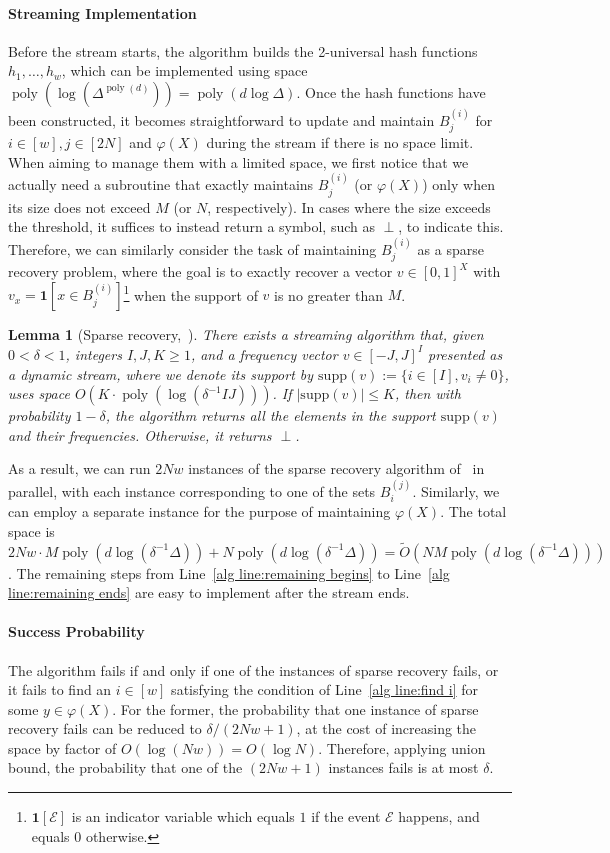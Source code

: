 \documentclass[letterpaper,11pt]{article}
\theoremstyle{plain}
\newtheorem{lemma}[theorem]{Lemma}
\theoremstyle{definition}
\theoremstyle{remark}
\DeclareMathOperator{\poly}{poly}
\renewcommand{\phi}{\varphi}
\newcommand{\calE}{\mathcal{E}}
\newcommand{\supp}{\mathrm{supp}}
\begin{document}
\begin{appendices}
\paragraph{Streaming Implementation}
Before the stream starts, the algorithm builds the 2-universal hash functions $h_1,\dots, h_w$, which can be implemented using space $\poly(\log (\Delta^{\poly(d)})) = \poly(d\log\Delta)$. 
Once the hash functions  have been constructed, it becomes straightforward to update and maintain $B^{(i)}_j$ for $i\in[w],j\in[2 N]$ and $\phi(X)$ during the stream if there is no space limit. 
When aiming to manage them with a limited space, we first notice that we actually need a subroutine that exactly maintains $B^{(i)}_j$ (or $\phi(X)$) only when its size does not exceed $ M$ (or $ N$, respectively).
In cases where the size exceeds the threshold, it suffices to instead return a symbol, such as $\perp$, to indicate this.
Therefore, we can similarly consider the task of maintaining $B_j^{(i)}$ as a sparse recovery problem, where the goal is to exactly recover a vector $v\in [0,1]^X$ with $v_x=\mathbf{1}[x\in B_j^{(i)}]$\footnote{$\mathbf{1}[\calE]$ is an indicator variable which equals $1$ if the event $\calE$ happens, and equals $0$ otherwise.} when the support of $v$ is no greater than $ M$.
\begin{lemma}[Sparse recovery,~\cite{Cormode06Combinatorial}]
    \label{lem:sparse recovery}
    There exists a streaming algorithm that, given $0<\delta<1$, integers $I,J,K\ge 1$, and a frequency vector $v\in [-J,J]^I$ presented as a dynamic stream, where we denote its support by $\supp(v):=\{i\in[I], v_i\neq 0\}$, uses space $O(K\cdot \poly(\log(\delta^{-1}IJ)))$. If $|\supp(v)|\le K$, then with probability $1-\delta$, the algorithm returns all the elements in the support $\supp(v)$ and their frequencies. Otherwise, it returns $\perp$.
\end{lemma}
As a result, we can run $2 N w$ instances of the sparse recovery algorithm of~ in parallel, with each instance corresponding to one of the sets $B_i^{(j)}$.
Similarly, we can employ a separate instance for the purpose of maintaining $\phi(X)$. The total space is $2 N w\cdot  M\poly(d\log(\delta^{-1}\Delta)) +  N\poly(d\log(\delta^{-1}\Delta)) = \tilde O( N M \poly(d\log(\delta^{-1}\Delta)))$. The remaining steps from Line~\ref{alg line:remaining begins} to Line~\ref{alg line:remaining ends} are easy to implement after the stream ends.
\paragraph{Success Probability} The algorithm fails if and only if one of the instances of sparse recovery fails, or it fails to find an $i\in [w]$ satisfying the condition of Line~\ref{alg line:find i} for some $y\in \phi(X)$. 
For the former, the probability that one instance of sparse recovery fails can be reduced to $\delta/(2 N w + 1)$, at the cost of increasing the space by factor of $O(\log ( N w)) = O(\log  N)$. Therefore, applying union bound, the probability that one of the $(2 N w + 1)$ instances fails is at most $\delta$.


\end{appendices}
\end{document}
